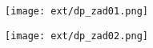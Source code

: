 

\texttt{[image: ext/dp\_zad01.png]}
\newpage

\thispagestyle{empty} %
\texttt{[image: ext/dp\_zad02.png]}

\newpage